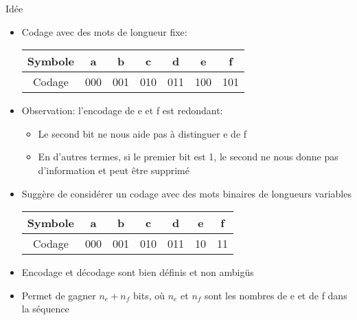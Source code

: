 \begin{frame}{Idée}

\begin{itemize}
\item Codage avec des mots de longueur fixe:
\begin{center}
\begin{tabular}{c|cccccc}
Symbole & a & b & c & d & e & f\\
\hline
Codage & 000 & 001 & 010 & 011 & 100 & 101\\
\end{tabular}
\end{center}

\item Observation: l'encodage de e et f est redondant:
\begin{itemize}
\item Le second bit ne nous aide pas à distinguer e de f
\item En d'autres termes, si le premier bit est 1, le second ne nous donne pas d'information et peut être supprimé
\end{itemize}
\item Suggère de considérer un codage avec des mots binaires de
  longueurs variables
\begin{center}
\begin{tabular}{c|cccccc}
Symbole & a & b & c & d & e & f\\
\hline
Codage & 000 & 001 & 010 & 011 & {\color{red}10}& {\color{red}11}\\
\end{tabular}
\end{center}
\item Encodage et décodage sont bien définis et non ambigüs
\item Permet de gagner $n_e+n_f$ bits, où $n_e$ et $n_f$ sont les nombres de e et de f dans la séquence
\end{itemize}
\end{frame}

